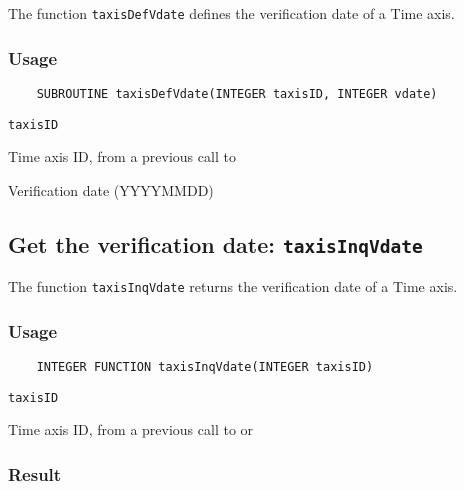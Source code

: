 The function {\tt taxisDefVdate} defines the verification date of a Time axis.

\subsubsection*{Usage}

\begin{verbatim}
    SUBROUTINE taxisDefVdate(INTEGER taxisID, INTEGER vdate)
\end{verbatim}

\hspace*{4mm}\begin{minipage}[]{15cm}
\begin{deflist}{\tt taxisID\ }
\item[{\tt taxisID}]
Time axis ID, from a previous call to {}
\item[{\tt vdate}]
Verification date (YYYYMMDD)

\end{deflist}
\end{minipage}


\subsection{Get the verification date: {\tt taxisInqVdate}}
\label{taxisInqVdate}

The function {\tt taxisInqVdate} returns the verification date of a Time axis.

\subsubsection*{Usage}

\begin{verbatim}
    INTEGER FUNCTION taxisInqVdate(INTEGER taxisID)
\end{verbatim}

\hspace*{4mm}\begin{minipage}[]{15cm}
\begin{deflist}{\tt taxisID\ }
\item[{\tt taxisID}]
Time axis ID, from a previous call to {} or {}

\end{deflist}
\end{minipage}

\subsubsection*{Result}

